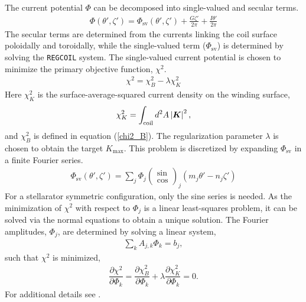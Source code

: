 \documentclass[aps,unsortedaddress]{revtex4-1}
\newcommand{\partder}[2]{\dfrac{\partial  #1}{\partial  #2}}
\begin{document}
The current potential $\Phi$ can be decomposed into single-valued and secular terms.
\begin{gather}
\Phi(\theta', \zeta') = \Phi_{\text{sv}}(\theta',\zeta') + \frac{ G \zeta'}{2 \pi} + \frac{I \theta'}{2 \pi}
\end{gather}
The secular terms are determined from the currents linking the coil surface poloidally and toroidally, while the single-valued term ($\Phi_{\text{sv}}$) is determined by solving the \texttt{REGCOIL} system. The single-valued current potential is chosen to minimize the primary objective function, $\chi^2$.
\begin{gather}
\chi^2 = \chi^2_B - \lambda \chi^2_K
\label{primary_objective}
\end{gather}
Here $\chi^2_K$ is the surface-average-squared current density on the winding surface,
\begin{gather}
\chi^2_K = \int_{\text{coil}} d^2A \, \abs{\bm{K}}^2,
\end{gather}
and $\chi^2_B$ is defined in equation (\ref{chi2_B}). The regularization parameter $\lambda$ is chosen to obtain the target $K_{\text{max}}$. This problem is discretized by expanding $\Phi_{\text{sv}}$ in a finite Fourier series.
\begin{gather}
\Phi_{\text{sv}}(\theta',\zeta') = \sum_j \Phi_j \left( \begin{array}{c} \sin \\ \cos \end{array} \right)_j (m_j \theta' - n_j \zeta')
\end{gather}
For a stellarator symmetric configuration, only the sine series is needed. As the minimization of $\chi^2$ with respect to $\Phi_{j}$ is a linear least-squares problem, it can be solved via the normal equations to obtain a unique solution. The Fourier amplitudes, $\Phi_j$, are determined by solving a linear system,
\begin{gather}
\sum_k A_{j,k} \Phi_k = b_j,
\label{forward}
\end{gather}
such that $\chi^2$ is minimized,
\begin{gather}
\partder{\chi^2}{\Phi_k} = \partder{\chi^2_B}{\Phi_k} + \lambda \partder{\chi^2_K}{\Phi_k} = 0.
\label{regcoil_minimization}
\end{gather}
For additional details see \cite{Landreman2017}.
\end{document}
